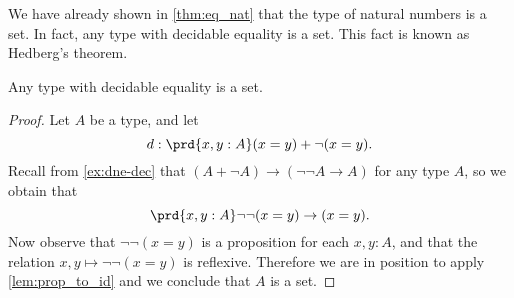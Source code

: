 \begin{comment}
\begin{lem}
  Suppose that $A$ and $B$ are types with decidable equality. Then the coproduct $A+B$ also has decidable equality.
\end{lem}

\begin{proof}
  Our goal is to construct a dependent function
  \begin{equation*}
    d_{A+B} : \prd{z,z':A+B}\isdecidable(z=z').
  \end{equation*}
  This function is constructed by coproduct induction on both $z$ and $z'$, so we have four cases to consider. Recall from \cref{thm:id-coprod-compute} that we have equivalences
  \begin{align*}
    (\inl(x)=\inl(x')) & \simeq (x=x') \\
    (\inl(x)=\inr(y')) & \simeq \emptyt \\
    (\inr(y)=\inl(x')) & \simeq \emptyt \\
    (\inr(y)=\inr(y')) & \simeq (y=y').
  \end{align*}
  Therefore the type $z=z'$ is equivalent to a decidable type in each of the four cases.
\end{proof}

\begin{cor}
  The type $\Z$ has decidable equality.
\end{cor}

\begin{cor}
  For any $n:\N$ the type $\Fin(n)$ has decidable equality. 
\end{cor}
\end{comment}

We have already shown in \cref{thm:eq_nat} that the type of natural numbers is a set. In fact, any type with decidable equality is a set. This fact is known as Hedberg's theorem.

\begin{thm}[Hedberg]
  Any type with decidable equality is a set.
\end{thm}

\begin{proof}
  Let $A$ be a type, and let
  \begin{equation*}
    d:\prd{x,y:A}(x=y)+\neg(x=y).
  \end{equation*}
  Recall from \cref{ex:dne-dec} that $(A+\neg A)\to (\neg\neg A\to A)$ for any type $A$, so we obtain that
  \begin{equation*}
    \prd{x,y:A}\neg\neg(x=y)\to (x=y).
  \end{equation*}
  Now observe that $\neg\neg(x=y)$ is a proposition for each $x,y:A$, and that the relation $x,y\mapsto\neg\neg(x=y)$ is reflexive. Therefore we are in position to apply \cref{lem:prop_to_id} and we conclude that $A$ is a set.
\end{proof}

